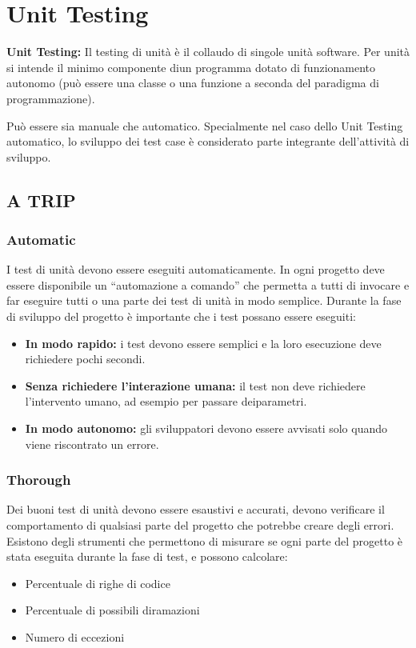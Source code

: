 \section{Unit Testing}
\begin{mdframed}
    \textbf{Unit Testing:} Il testing di unità è il collaudo di singole unità software. Per unità si intende il minimo componente diun programma dotato di funzionamento autonomo (può essere una classe o una funzione a seconda del paradigma di programmazione).
\end{mdframed}
Può essere sia manuale che automatico. Specialmente nel caso dello Unit Testing automatico, lo sviluppo dei test case è considerato parte integrante dell'attività di sviluppo.
  
\subsection{A TRIP}

\subsubsection{Automatic}
I test di unità devono essere eseguiti automaticamente. In ogni progetto deve essere disponibile un “automazione a comando” che permetta a tutti di invocare e far eseguire tutti o una parte dei test di unità in modo semplice.
Durante la fase di sviluppo del progetto è importante che i test possano essere eseguiti:
\begin{itemize}
    \item \textbf{In modo rapido:} i test devono essere semplici e la loro esecuzione deve richiedere pochi secondi.
    \item \textbf{Senza richiedere l'interazione umana:} il test non deve richiedere l'intervento umano, ad esempio per passare deiparametri.
    \item \textbf{In modo autonomo:} gli sviluppatori devono essere avvisati solo quando viene riscontrato un errore.
\end{itemize}

\subsubsection{Thorough}
Dei buoni test di unità devono essere esaustivi e accurati, devono verificare il comportamento di qualsiasi parte del progetto che potrebbe creare degli errori.
Esistono degli strumenti che permettono di misurare se ogni parte del progetto è stata
eseguita durante la fase di test, e possono calcolare:
\begin{itemize}
    \item Percentuale di righe di codice
    \item Percentuale di possibili diramazioni
    \item Numero di eccezioni
\end{itemize}

